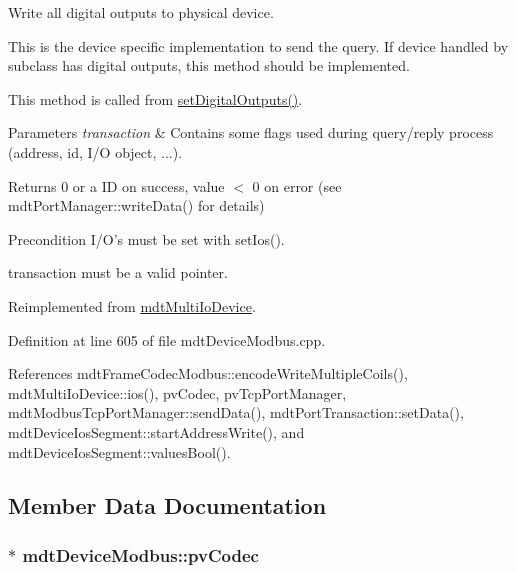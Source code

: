 Write all digital outputs to physical device. 

This is the device specific implementation to send the query. If device handled by subclass has digital outputs, this method should be implemented.

This method is called from \hyperlink{classmdt_multi_io_device_a83f6df71dc35ef002ee55b3a51a54fc9}{set\-Digital\-Outputs()}.


\begin{DoxyParams}{Parameters}
{\em transaction} & Contains some flags used during query/reply process (address, id, I/\-O object, ...). \\
\hline
\end{DoxyParams}
\begin{DoxyReturn}{Returns}
0 or a I\-D on success, value $<$ 0 on error (see mdt\-Port\-Manager\-::write\-Data() for details) 
\end{DoxyReturn}
\begin{DoxyPrecond}{Precondition}
I/\-O's must be set with set\-Ios(). 

transaction must be a valid pointer. 
\end{DoxyPrecond}


Reimplemented from \hyperlink{classmdt_multi_io_device_a03aedb552abcc344b1545d95f261e387}{mdt\-Multi\-Io\-Device}.



Definition at line 605 of file mdt\-Device\-Modbus.\-cpp.



References mdt\-Frame\-Codec\-Modbus\-::encode\-Write\-Multiple\-Coils(), mdt\-Multi\-Io\-Device\-::ios(), pv\-Codec, pv\-Tcp\-Port\-Manager, mdt\-Modbus\-Tcp\-Port\-Manager\-::send\-Data(), mdt\-Port\-Transaction\-::set\-Data(), mdt\-Device\-Ios\-Segment\-::start\-Address\-Write(), and mdt\-Device\-Ios\-Segment\-::values\-Bool().



\subsection{Member Data Documentation}
\hypertarget{classmdt_device_modbus_a2171d37ea720d546934f1c841e3c4d26}{
\subsubsection[{pv\-Codec}]{$\ast$ mdt\-Device\-Modbus\-::pv\-Codec\hspace{0.3cm}{\ttfamily [protected]}}}\label{classmdt_device_modbus_a2171d37ea720d546934f1c841e3c4d26}


